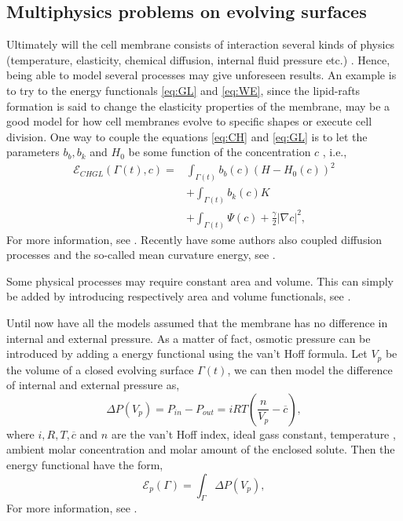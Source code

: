 \subsection{Multiphysics problems on evolving surfaces}%

Ultimately will the cell membrane consists of interaction several kinds of physics (temperature, elasticity, chemical diffusion, internal fluid pressure etc.) \cite{udo97}. Hence, being able to model several processes may give unforeseen results. An example is to try to the
energy functionals \eqref{eq:GL}  and \eqref{eq:WE}, since the lipid-rafts formation is said to change the elasticity properties of the membrane, may be a good model for how cell membranes evolve to specific shapes or execute cell division. One way
to couple the equations \eqref{eq:CH} and \eqref{eq:GL} is to let the parameters $b_{b}, b_{k}$ and $ H_{0} $ be some function of the concentration $c$ , i.e.,
\[
    \begin{split}
        \mathcal{E}_{CHGL} \left( \Gamma\left( t \right) ,c   \right) =  & \int_{\Gamma\left( t \right)  }^{}  b_{b}\left( c \right)  \left( H- H_{0}\left( c \right)  \right) ^{2}  \\
        & + \int_{\Gamma\left(t  \right)   }^{} b_{k}\left( c \right)  K \\
        &+ \int_{\Gamma\left(t  \right)   }^{}\Psi \left( c \right) + \frac{\gamma}{2} \left\lvert \nabla c \right\rvert^{2} ,
    \end{split}
\]
For more information, see \cite{elliott2010surface}. Recently have some authors also coupled diffusion processes and the so-called mean curvature energy, see \cite{burger2021interaction, elliott2022numerical}.

Some physical processes may require constant area and volume. This can simply be added by introducing respectively area and volume functionals, see \cite[Definition 2.5]{muller2013volume}.


Until now have all the models assumed that the membrane has no difference in internal and external pressure. As a matter of fact, osmotic pressure can be introduced by adding a energy functional using the van't Hoff formula. Let $V_{p}$ be the volume
of a closed evolving surface $\Gamma \left( t \right) $, we can then model the difference of internal and external pressure as,
\[
\Delta P \left( V_{p} \right) = P_{in} - P_{out} = iRT\left( \frac{n}{V_{p}} - \overline{c}  \right),
\]
where $i, R, T, \overline{c} $ and $n$ are the van't Hoff index, ideal gass constant, temperature , ambient molar concentration and molar amount of the enclosed solute. Then the energy
functional have the form,
\[
\mathcal{E} _{p}\left( \Gamma    \right)  = \int_{\Gamma   }^{   } \Delta P\left( V_{p} \right) ,
\]
For more information, see \cite{zhu2022mem3dg}.


